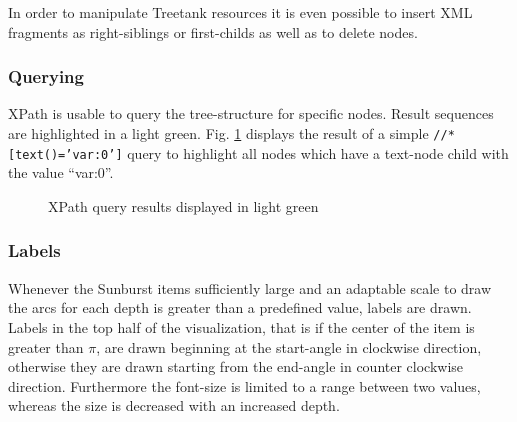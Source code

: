 \begin{itemize}
In order to manipulate Treetank resources it is even possible to insert XML fragments as right-siblings or first-childs as well as to delete nodes.

\subsubsection{Querying}
XPath is usable to query the tree-structure for specific nodes. Result sequences are highlighted in a light green. Fig. \ref{fig:sunburstxpath} displays the result of a simple \texttt{//*[text()='var:0']} query to highlight all nodes which have a text-node child with the value ``var:0''.

\begin{figure}[tb]
\caption{\label{fig:sunburstxpath} XPath query results displayed in light green}
\end{figure}

\subsubsection{Labels}
Whenever the Sunburst items sufficiently large and an adaptable scale to draw the arcs for each depth is greater than a predefined value, labels are drawn. Labels in the top half of the visualization, that is if the center of the item is greater than $\pi$, are drawn beginning at the start-angle in clockwise direction, otherwise they are drawn starting from the end-angle in counter clockwise direction. Furthermore the font-size is limited to a range between two values, whereas the size is decreased with an increased depth. 


\end{itemize}
